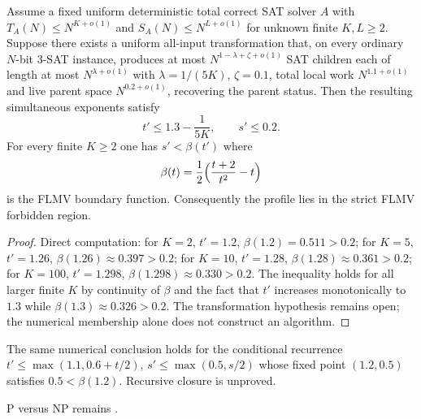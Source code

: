 
\begin{theorem}\label{thm:conditional-membership}
Assume a fixed uniform deterministic total correct SAT solver \(A\) with
\(T_A(N)\le N^{K+o(1)}\) and \(S_A(N)\le N^{L+o(1)}\) for unknown finite \(K,L\ge 2\).
Suppose there exists a uniform all-input transformation that, on every ordinary
\(N\)-bit 3-SAT instance, produces at most \(N^{1-\lambda+\zeta+o(1)}\) SAT children
each of length at most \(N^{\lambda+o(1)}\) with \(\lambda=1/(5K)\), \(\zeta=0.1\),
total local work \(N^{1.1+o(1)}\) and live parent space \(N^{0.2+o(1)}\),
recovering the parent status. Then the resulting simultaneous exponents satisfy
\[
t'\le 1.3-\frac1{5K},\qquad s'\le 0.2.
\]
For every finite \(K\ge 2\) one has \(s'<\beta(t')\) where
\[
\beta(t)=\frac12\Bigl(\frac{t+2}{t^2}-t\Bigr)
\]
is the FLMV boundary function. Consequently the profile lies in the strict
FLMV forbidden region.
\end{theorem}

\begin{proof}
Direct computation: for \(K=2\), \(t'=1.2\), \(\beta(1.2)=0.511>0.2\);
for \(K=5\), \(t'=1.26\), \(\beta(1.26)\approx0.397>0.2\);
for \(K=10\), \(t'=1.28\), \(\beta(1.28)\approx0.361>0.2\);
for \(K=100\), \(t'=1.298\), \(\beta(1.298)\approx0.330>0.2\).
The inequality holds for all larger finite \(K\) by continuity of \(\beta\)
and the fact that \(t'\) increases monotonically to \(1.3\) while \(\beta(1.3)\approx0.326>0.2\).
The transformation hypothesis remains open; the numerical membership alone
does not construct an algorithm.
\end{proof}

\begin{remark}
The same numerical conclusion holds for the conditional recurrence
\(t'\le\max(1.1,0.6+t/2)\), \(s'\le\max(0.5,s/2)\) whose fixed point
\((1.2,0.5)\) satisfies \(0.5<\beta(1.2)\). Recursive closure is unproved.
\end{remark}

P versus NP remains \OPEN.

